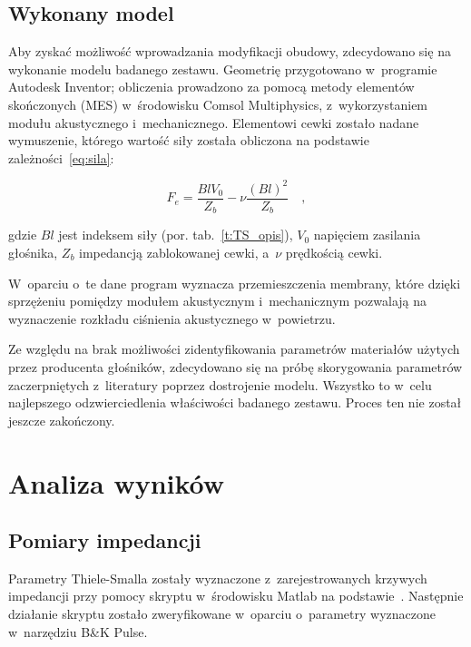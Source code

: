 \documentclass[12pt]{oska}
\begin{document}
	\subsection{Wykonany model}
	
	Aby zyskać możliwość wprowadzania modyfikacji obudowy, zdecydowano się na wykonanie modelu badanego zestawu. Geometrię przygotowano w~programie Autodesk Inventor; obliczenia prowadzono za pomocą metody elementów skończonych (MES) w~środowisku Comsol Multiphysics, z~wykorzystaniem modułu akustycznego i~mechanicznego. Elementowi cewki zostało nadane wymuszenie, którego wartość siły została obliczona na podstawie zależności~\eqref{eq:sila}:
	
	\begin{equation}
	F_e=\frac{BlV_0}{Z_b}-\nu\frac{(Bl)^2}{Z_b} \quad, \label{eq:sila}
	\end{equation}
	
	\noindent gdzie $Bl$ jest indeksem siły (por. tab.~\ref{t:TS_opis}), $V_0$ napięciem zasilania głośnika, $Z_b$ impedancją zablokowanej cewki, a~$\nu$ prędkością cewki. 
	
	W~oparciu o~te dane program wyznacza przemieszczenia membrany, które dzięki sprzężeniu pomiędzy modułem akustycznym i~mechanicznym pozwalają na wyznaczenie rozkładu ciśnienia akustycznego w~powietrzu.
	
	Ze względu na brak możliwości zidentyfikowania parametrów materiałów użytych przez producenta głośników, zdecydowano się na próbę skorygowania parametrów zaczerpniętych z~literatury \cite{modelowanie} poprzez dostrojenie modelu. Wszystko to w~celu najlepszego odzwierciedlenia właściwości badanego zestawu. Proces ten nie został jeszcze zakończony.
	
	
	\section{Analiza wyników}
	
	\subsection{Pomiary impedancji}
	
	Parametry Thiele-Smalla zostały wyznaczone z~zarejestrowanych krzywych impedancji przy pomocy skryptu w~środowisku Matlab na podstawie~\cite{dobrucki}. Następnie działanie skryptu zostało zweryfikowane w~oparciu o~parametry wyznaczone w~narzędziu B\&K Pulse. 
	
\end{document}
